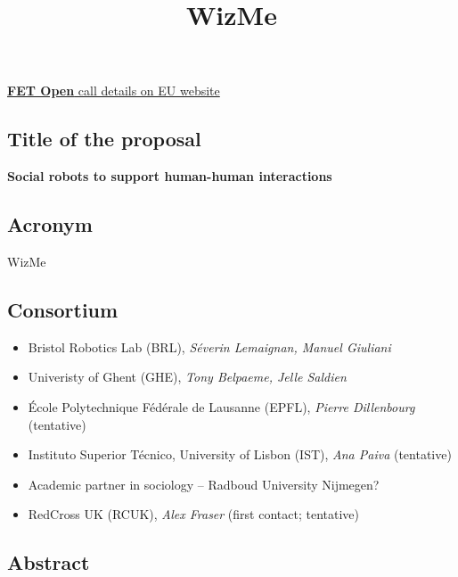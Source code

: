 \documentclass[]{article}
\begin{document}
\title{WizMe}

\href{https://ec.europa.eu/info/funding-tenders/opportunities/portal/screen/opportunities/topic-details/fetopen-01-2018-2019-2020;freeTextSearchKeyword=;typeCodes=1;statusCodes=31094501,31094502;programCode=null;programDivisionCode=null;focusAreaCode=null;crossCuttingPriorityCode=null;callCode=31088571;sortQuery=openingDate;onlyTenders=false}{\textbf{FET
Open} call details on EU website}

\hypertarget{title-of-the-proposal}{%
\subsection{Title of the proposal}\label{title-of-the-proposal}}

\textbf{Social robots to support human-human interactions}

\hypertarget{acronym}{%
\subsection{Acronym}\label{acronym}}

WizMe

\hypertarget{consortium}{%
\subsection{Consortium}\label{consortium}}

\begin{itemize}

\item
  Bristol Robotics Lab (BRL), \emph{Séverin Lemaignan, Manuel Giuliani}
\item
  Univeristy of Ghent (GHE), \emph{Tony Belpaeme, Jelle Saldien}
\item
  École Polytechnique Fédérale de Lausanne (EPFL), \emph{Pierre
  Dillenbourg} (tentative)
\item
  Instituto Superior Técnico, University of Lisbon (IST), \emph{Ana
  Paiva} (tentative)
\item
  Academic partner in sociology -- Radboud University Nijmegen?
\item
  RedCross UK (RCUK), \emph{Alex Fraser} (first contact; tentative)
\end{itemize}

\subsection{Abstract}\label{abstract}
\end{document}
